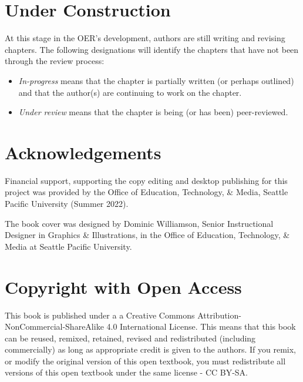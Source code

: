 \documentclass[
  11pt,
]{book}
\providecommand{\tightlist}{%
  \setlength{\itemsep}{0pt}\setlength{\parskip}{0pt}}
\begin{document}
\hypertarget{under-construction}{%
\section*{Under Construction}\label{under-construction}}

At this stage in the OER's development, authors are still writing and revising chapters. The following designations will identify the chapters that have not been through the review process:

\begin{itemize}
\tightlist
\item
  \emph{In-progress} means that the chapter is partially written (or perhaps outlined) and that the author(s) are continuing to work on the chapter.
\item
  \emph{Under review} means that the chapter is being (or has been) peer-reviewed.
\end{itemize}

\hypertarget{acknowledgements}{%
\section*{Acknowledgements}\label{acknowledgements}}

Financial support, supporting the copy editing and desktop publishing for this project was provided by the Office of Education, Technology, \& Media, Seattle Pacific University (Summer 2022).

The book cover was designed by Dominic Williamson, Senior Instructional Designer in Graphics \& Illustrations, in the Office of Education, Technology, \& Media at Seattle Pacific University.

\hypertarget{copyright-with-open-access}{%
\section*{Copyright with Open Access}\label{copyright-with-open-access}}

This book is published under a a Creative Commons Attribution-NonCommercial-ShareAlike 4.0 International License. This means that this book can be reused, remixed, retained, revised and redistributed (including commercially) as long as appropriate credit is given to the authors. If you remix, or modify the original version of this open textbook, you must redistribute all versions of this open textbook under the same license - CC BY-SA.
\end{document}
